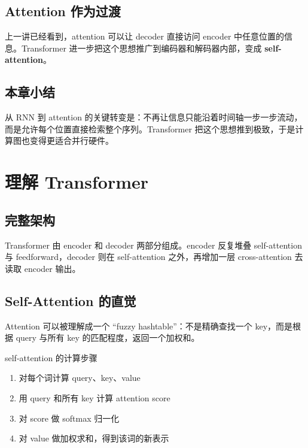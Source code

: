 \documentclass[a4paper]{article}
\begin{document}
\subsection{Attention 作为过渡}

上一讲已经看到，attention 可以让 decoder 直接访问 encoder 中任意位置的信息。Transformer 进一步把这个思想推广到编码器和解码器内部，变成 \textbf{self-attention}。









\subsection{本章小结}

从 RNN 到 attention 的关键转变是：不再让信息只能沿着时间轴一步一步流动，而是允许每个位置直接检索整个序列。Transformer 把这个思想推到极致，于是计算图也变得更适合并行硬件。


\section{理解 Transformer}

\subsection{完整架构}

Transformer 由 encoder 和 decoder 两部分组成。encoder 反复堆叠 self-attention 与 feedforward，decoder 则在 self-attention 之外，再增加一层 cross-attention 去读取 encoder 输出。





\subsection{Self-Attention 的直觉}

Attention 可以被理解成一个 ``fuzzy hashtable''：不是精确查找一个 key，而是根据 query 与所有 key 的匹配程度，返回一个加权和。





\begin{importantbox}{self-attention 的计算步骤}
\begin{enumerate}
    \item 对每个词计算 query、key、value
    \item 用 query 和所有 key 计算 attention score
    \item 对 score 做 softmax 归一化
    \item 对 value 做加权求和，得到该词的新表示
\end{enumerate}
\end{importantbox}
\end{document}
